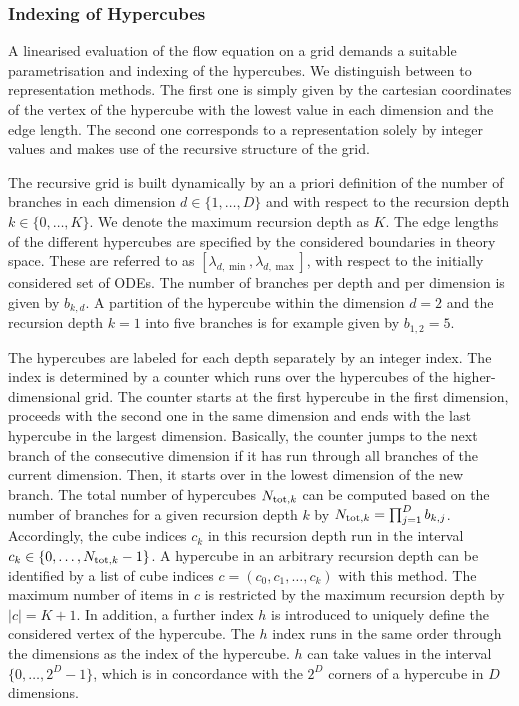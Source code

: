 \documentclass[paper=a4,11pt,bibliography=totoc]{scrartcl}
\begin{document}
\subsubsection{Indexing of Hypercubes}
\label{sec:IndexingOfHypercubes}

A linearised evaluation of the flow equation on a grid demands a suitable parametrisation and indexing of the hypercubes. We distinguish between to representation methods. The first one is simply given by the cartesian coordinates of the vertex of the hypercube with the lowest value in each dimension and the edge length. The second one corresponds to a representation solely by integer values and makes use of the recursive structure of the grid.

The recursive grid is built dynamically by an a priori definition of the number of branches in each dimension $d\in\lbrace1,\ldots,D\rbrace$ and with respect to the recursion depth $k\in\lbrace0,\ldots,K\rbrace$. We denote the maximum recursion depth as $K$. The edge lengths of the different hypercubes are specified by the considered boundaries in theory space. These are referred to as $[\lambda_{d,\min}, \lambda_{d,\max}]$, with respect to the initially considered set of ODEs. The number of branches per depth and per dimension is given by $b_{k, d}$. A partition of the hypercube within the dimension $d=2$ and the recursion depth $k=1$ into five branches is for example given by $b_{1, 2} = 5$.

The hypercubes are labeled for each depth separately by an integer index. The index is determined by a counter which runs over the hypercubes of the higher-dimensional grid. The counter  starts at the first hypercube in the first dimension, proceeds with the second one in the same dimension and ends with the last hypercube in the largest dimension. Basically, the counter jumps to the next branch of the consecutive dimension if it has run through all branches of the current dimension. Then, it starts over in the lowest dimension of the new branch. The total number of hypercubes $N_{\textnormal{tot}, k}$ can be computed based on the number of branches for a given recursion depth $k$ by $N_{\textnormal{tot}, k}=\prod_{j=1}^{D} b_{k, j}$. Accordingly, the cube indices $c_k$ in this recursion depth run in the interval $c_k\in\lbrace 0, \ldots, N_{\textnormal{tot}, k}-1\rbrace$. A hypercube in an arbitrary recursion depth can be identified by a list of cube indices $c=\left(c_0, c_1, \dots, c_k\right)$ with this method. The maximum number of items in $c$ is restricted by the maximum recursion depth by $|c|=K+1$. In addition, a further index $h$ is introduced to uniquely define the considered vertex of the hypercube. The $h$ index runs in the same order through the dimensions as the index of the hypercube. $h$ can take values in the interval $\lbrace 0, \ldots, 2^D-1\rbrace$, which is in concordance with the $2^D$ corners of a hypercube in $D$ dimensions.
\end{document}
